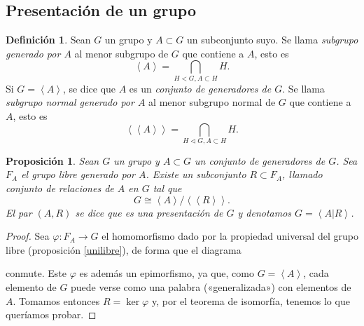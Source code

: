 \documentclass[12pt,a4paper]{book}
\newtheorem{prop}[thm]{Proposición}
\theoremstyle{definition} \newtheorem{defn}[thm]{Definición}
\theoremstyle{definition} \newtheorem{ejemplo}[thm]{Ejemplo}
\theoremstyle{definition} \newtheorem{ejercicio}[thm]{Ejercicio}
\theoremstyle{remark} \newtheorem*{obs}{Observación}
\newcommand\gen[1]{\left\langle #1 \right\rangle}
\newcommand\ngen[1]{\left\langle\left\langle #1 \right\rangle \right\rangle}
\begin{document}
 \subsection{Presentación de un grupo}
 \begin{defn}
   Sean $G$ un grupo y $A\subset G$ un subconjunto suyo. Se llama \emph{subgrupo generado por $A$} al menor subgrupo de $G$ que contiene a $A$, esto es
   \begin{equation*}
     \gen{A}=\bigcap_{H<G, A\subset H}H.     
   \end{equation*}
   Si $G=\gen{A}$, se dice que $A$ es un \emph{conjunto de generadores de $G$}.
 Se llama \emph{subgrupo normal generado por $A$} al menor subgrupo normal de $G$ que contiene a $A$, esto es
   \begin{equation*}
     \ngen{A}=\bigcap_{H\lhd G, A\subset H}H.     
   \end{equation*}
 \end{defn}
 \begin{prop}
   Sean $G$ un grupo y $A\subset G$ un conjunto de generadores de $G$. Sea $F_A$ el grupo libre generado por $A$. Existe un subconjunto $R\subset F_A$, llamado \emph{conjunto de relaciones de $A$ en $G$} tal que 
   \begin{equation*}
     G\cong \gen{A}/\ngen{R}.
   \end{equation*}
   El par $(A,R)$ se dice que es una \emph{presentación de $G$} y denotamos $G=\gen{A|R}$.
 \end{prop}
 \begin{proof}
   Sea $\varphi:F_A\rightarrow G$ el homomorfismo dado por la propiedad universal del grupo libre (proposición \ref{unilibre}), de forma que el diagrama
  \begin{center}
   \end{center}
   conmute. Este $\varphi$ es además un epimorfismo, ya que, como $G=\gen{A}$, cada elemento de $G$ puede verse como una palabra («generalizada») con elementos de $A$. Tomamos entonces $R=\ker \varphi$ y, por el teorema de isomorfía, tenemos lo que queríamos probar.
 \end{proof}
\end{document}
